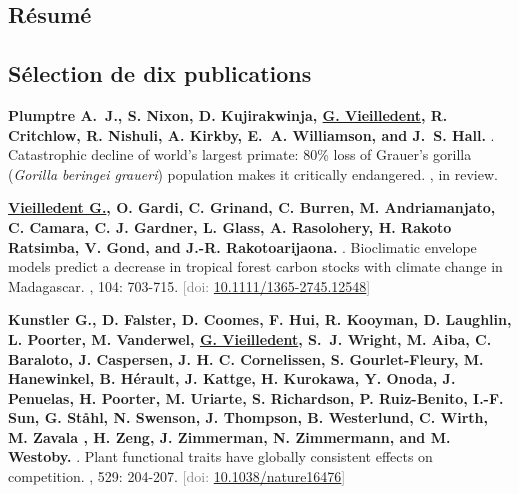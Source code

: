 \documentclass[10pt,a4paper,sans]{moderncv}
\newcounter{enumiv_gv}
\begin{document}
\vspace{0.3cm}
\subsection{Résumé}


\vspace{0.3cm}
\subsection{Sélection de dix publications}

\begin{thebibliography}{10}

\setcounter{enumiv}{9}
\textbf{Plumptre A.~J., S. Nixon, D. Kujirakwinja, \underline{G. Vieilledent}, R. Critchlow, R. Nishuli, A. Kirkby, E.~A. Williamson, and J.~S. Hall.} 
.
\newblock Catastrophic decline of world’s largest primate: 80\% loss of Grauer’s gorilla (\emph{Gorilla beringei graueri}) population makes it critically endangered.
, in review.

\setcounter{enumiv}{8}
\textbf{\underline{Vieilledent G.}, O. Gardi, C. Grinand, C. Burren, M. Andriamanjato, C. Camara, C. J. Gardner, L. Glass, A. Rasolohery, H. Rakoto Ratsimba, V. Gond, and J.-R. Rakotoarijaona.} 
.
\newblock Bioclimatic envelope models predict a decrease in tropical forest carbon stocks with climate change in Madagascar.
, 104: 703-715.
\newblock \textcolor{gray}{[doi: \href{http://dx.doi.org/10.1111/1365-2745.12548}{10.1111/1365-2745.12548}]}

\setcounter{enumiv}{7}
\textbf{Kunstler G., D. Falster, D. Coomes, F. Hui, R. Kooyman, D. Laughlin, L. Poorter, M. Vanderwel, \underline{G. Vieilledent}, S.~J. Wright, M. Aiba, C. Baraloto, J. Caspersen, J. H. C. Cornelissen, S. Gourlet-Fleury, M. Hanewinkel, B. Hérault, J. Kattge, H. Kurokawa, Y. Onoda, J. Penuelas, H. Poorter, M. Uriarte, S. Richardson, P. Ruiz-Benito, I.-F. Sun, G. Ståhl, N. Swenson, J. Thompson, B. Westerlund, C. Wirth, M. Zavala , H. Zeng, J. Zimmerman, N. Zimmermann, and M. Westoby.} 
.
\newblock Plant functional traits have globally consistent effects on competition.
, 529: 204-207.
\newblock \textcolor{gray}{[doi: \href{http://dx.doi.org/10.1038/nature16476}{10.1038/nature16476}]}


\end{thebibliography}
\end{document}
